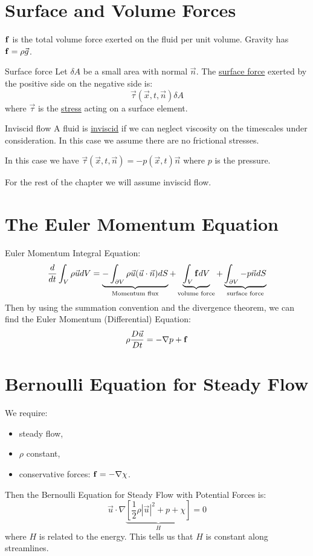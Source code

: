 \documentclass[../Main.tex]{subfiles}
\begin{document}
\section{Surface and Volume Forces}
$\mathbf{f}$ is the total volume force exerted on the fluid per unit volume. Gravity has $\mathbf{f} = \rho \vec{g}$.
\begin{definition}{Surface force}
    Let $\delta A$ be a small area with normal $\vec{n}$. The \underline{surface force} exerted by the positive side on the negative side is:
    \begin{equation*}
        \vec{\tau}(\vec{x}, t, \vec{n}) \delta A
    \end{equation*}
    where $\vec{\tau}$ is the \underline{stress} acting on a surface element.
\end{definition}
\begin{definition}{Inviscid flow}
    A fluid is \underline{inviscid} if we can neglect viscosity on the timescales under consideration. In this case we assume there are no frictional stresses.
\end{definition}
In this case we have $\vec{\tau}(\vec{x}, t, \vec{n}) = -p(\vec{x}, t)\vec{n}$ where $p$ is the pressure.

For the rest of the chapter we will assume inviscid flow.
\section{The Euler Momentum Equation}
Euler Momentum Integral Equation:
\begin{equation}
    \frac{d}{dt} \int_V \rho \vec{u} dV = \underbrace{-\int_{\partial V} \rho \vec{u}(\vec{u} \cdot \vec{n})dS}_{\text{Momentum flux}} + \underbrace{\int_V \mathbf{f} dV}_{\text{volume force}} + \underbrace{\int_{\partial V}-p\vec{n} dS}_{\text{surface force}}
    \label{eqnEulerMomInt}
\end{equation}
Then by using the summation convention and the divergence theorem, we can find the Euler Momentum (Differential) Equation:
\begin{equation}
    \rho \frac{D \vec{u}}{D t} = - \nabla p + \mathbf{f}
    \label{eqnEulerMomDiff}
\end{equation}
\section{Bernoulli Equation for Steady Flow}
We require:
\begin{itemize}
    \item steady flow,
    \item $\rho$ constant,
    \item conservative forces: $\mathbf{f} = -\nabla \chi$.
\end{itemize}
Then the Bernoulli Equation for Steady Flow with Potential Forces is:
\begin{equation}
    \vec{u} \cdot \nabla \underbrace{\left[\frac12 \rho |\vec{u}|^2 + p + \chi\right]}_H = 0
    \label{eqnSteadyBernoulli}
\end{equation}
where $H$ is related to the energy. This tells us that $H$ is constant along streamlines.
\end{document}
